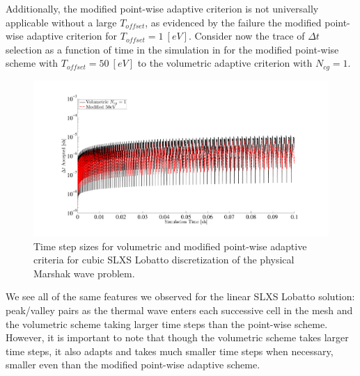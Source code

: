 Additionally, the modified point-wise adaptive criterion is not universally applicable without a large $T_{offset}$, as evidenced by the failure the modified point-wise adaptive criterion for $T_{offset}=1~[eV]$.
Consider now the trace of $\Delta t$ selection as a function of time in the simulation in  for the modified point-wise scheme with $T_{offset}=50~[eV]$ to the volumetric adaptive criterion with $N_{cg}=1$.
\begin{figure}[!htp]
\centering
\includegraphics[width=16cm,trim=2in  0.4in 0.5in 0.75in,clip=true]{chapter6_grey_radtran/Dissertation_Data/Volumetric_1C_vs_50ev_in_time.pdf}
\caption{Time step sizes for volumetric and modified point-wise adaptive criteria for cubic SLXS Lobatto discretization of the physical Marshak wave problem.}
\label{fig:50ev_1C}
\end{figure}
We see all of the same features we observed for the linear SLXS Lobatto solution: peak/valley pairs as the thermal wave enters each successive cell in the mesh and the volumetric scheme taking larger time steps than the point-wise scheme.  
However, it is important to note that though the volumetric scheme takes larger time steps, it also adapts and takes much smaller time steps when necessary, smaller even than the modified point-wise adaptive scheme.

